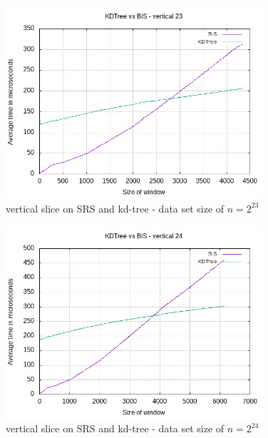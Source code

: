\begin{figure}[h]
    \centering
    \includegraphics[width = 0.85\textwidth]{pictures/analysis/vert_23.png}
    \caption{vertical slice on SRS and kd-tree - data set size of $n=2^{23}$}\label{fig:vert_23}
\end{figure}

\begin{figure}[h]
    \centering
    \includegraphics[width = 0.85\textwidth]{pictures/analysis/vert_24.png}
    \caption{vertical slice on SRS and kd-tree - data set size of $n=2^{24}$}\label{fig:vert_24}
\end{figure}

